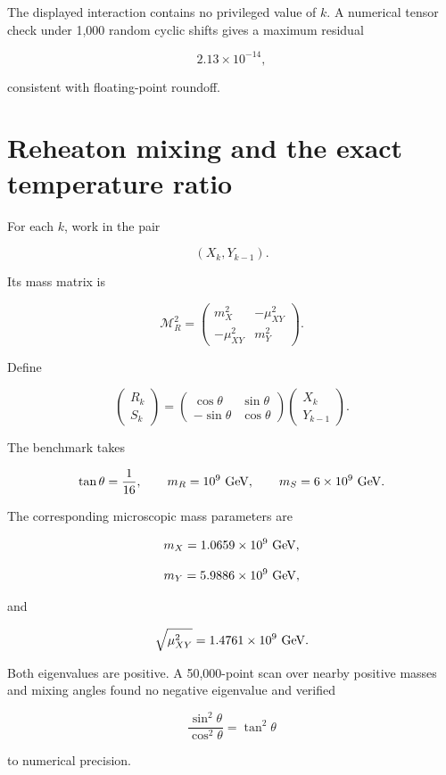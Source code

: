 \documentclass[
  10pt,
]{article}
\begin{document}
The displayed interaction contains no privileged value of \(k\). A
numerical tensor check under 1,000 random cyclic shifts gives a maximum
residual

\[
2.13\times10^{-14},
\]

consistent with floating-point roundoff.

\section{Reheaton mixing and the exact temperature
ratio}\label{reheaton-mixing-and-the-exact-temperature-ratio}

For each \(k\), work in the pair

\[
(X_k,Y_{k-1}).
\]

Its mass matrix is

\[
\mathcal M_R^2
=
\begin{pmatrix}
 m_X^2&-\mu_{XY}^2\\
 -\mu_{XY}^2&m_Y^2
\end{pmatrix}.
\]

Define

\[
\begin{pmatrix}
R_k\\S_k
\end{pmatrix}
=
\begin{pmatrix}
\cos\theta&\sin\theta\\
-\sin\theta&\cos\theta
\end{pmatrix}
\begin{pmatrix}
X_k\\Y_{k-1}
\end{pmatrix}.
\]

The benchmark takes

\[
\tan\theta=\frac1{16},
\qquad
m_R=10^9\ {\rm GeV},
\qquad
m_S=6\times10^9\ {\rm GeV}.
\]

The corresponding microscopic mass parameters are

\[
m_X=1.0659\times10^9\ {\rm GeV},
\]

\[
m_Y=5.9886\times10^9\ {\rm GeV},
\]

and

\[
\sqrt{\mu_{XY}^2}=1.4761\times10^9\ {\rm GeV}.
\]

Both eigenvalues are positive. A 50,000-point scan over nearby positive
masses and mixing angles found no negative eigenvalue and verified

\[
\frac{\sin^2\theta}{\cos^2\theta}=\tan^2\theta
\]

to numerical precision.
\end{document}
